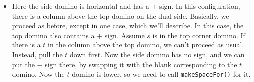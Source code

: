 \documentclass[12pt]{article}
\numberwithin{equation}{section}
\begin{document}
\begin{itemize}
\begin{itemize}
\begin{itemize}
        \item Here the side domino is horizontal and has a $+$ sign.
        In this configuration, there is a column above the top domino on the dual side.
        Basically, we proceed as before, except in one case, which we'll describe.
        In this case, the top domino also contains a $+$ sign.
        Assume $s$ is in the top corner domino.
        If there is a $t$ in the column above the top domino, we can't proceed as usual.
        Instead, pull the $t$ down first.
        Now the side domino has no sign, and we can put the $-$ sign there, by swapping it with the blank corresponding to the $t$ domino.
        Now the $t$ domino is lower, so we need to call \texttt{makeSpaceFor()} for it.
        \begin{figure}[H]
          \centering
        \end{figure}
        \begin{figure}[H]
          \centering

\end{figure}
\end{itemize}
\end{itemize}
\end{itemize}
\end{document}
